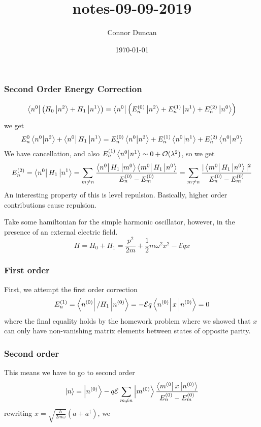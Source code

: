 \documentclass{article}
\author{Connor Duncan}
\date{\today}
\title{notes-09-09-2019}
\theoremstyle{definition}
\begin{document}
\subsubsection{Second Order Energy Correction} \begin{equation} \bra{n^0}\left(H_0\ket{n^2}+H_1\ket{n^1}\right)=\bra{n^0}\left(E_n^{(0)}\ket{n^2}+E_n^{(1)}\ket{n^1}+E_n^{(2)}\ket{n^0}\right) \end{equation} we get \begin{equation} E_n^{0}\bra{n^0}\ket{n^2}+\bra{n^0}H_1\ket{n^1}=E_n^{(0)}\bra{n^0}\ket{n^2}+E_n^{(1)}\bra{n^0}\ket{n^1}+E_n^{(2)}\bra{n^0}\ket{n^0} \end{equation} We have cancellation, and also $E_n^{(1)}\bra{n^0}\ket{n^1}\sim0+\mathcal{O}(\lambda^2)$, so we get \begin{equation} E_n^{(2)}=\bra{n^0}H_1\ket{n^{1}}=\sum_{m\neq n} \frac{ \bra{n^0}H_1\ket{m^{0}}\bra{m^0}H_1\ket{n^0} }{E_n^{(0)}-E_m^{(0)}} = \sum_{m\neq n} \frac{ |\bra{m^0}H_1\ket{n^0}|^2}{E_n^{(0)}-E_m^{(0)}} \end{equation} An interesting property of this is level repulsion. Basically, higher order contributions cause repulsion. \begin{center}  \end{center} Take some hamiltonian for the simple harmonic oscillator, however, in the presence of an external electric field. \begin{equation} H=H_0+H_1=\frac{p^2}{2m}+\frac{1}{2}m\omega^2x^2-\mathcal{E}qx \end{equation} \subsubsection{First order} First, we attempt the first order correction \begin{equation} E_n^{(1)}=\bra{n^{(0)}}/H_1\ket{n^{(0)}}=-\mathcal Eq\bra{n^{(0)}}x\ket{n^{(0)}}=0 \end{equation} where the final equality holds by the homework problem where we showed that $x$ can only have non-vanishing matrix elements between states of opposite parity. \subsubsection{Second order} This means we have to go to second order \begin{equation} \ket{n}=\ket{n^{(0)}}-q\mathcal E\sum_{m\neq n}\ket{m^{(0)}}\frac{ \bra{m^{(0}}x\ket{n^{(0)}} }{E_n^{(0)}-E_m^{(0)}} \end{equation} rewriting $x=\sqrt{\frac{\hbar}{2m\omega}}(a+a^\dag)$, we 
\end{document}
